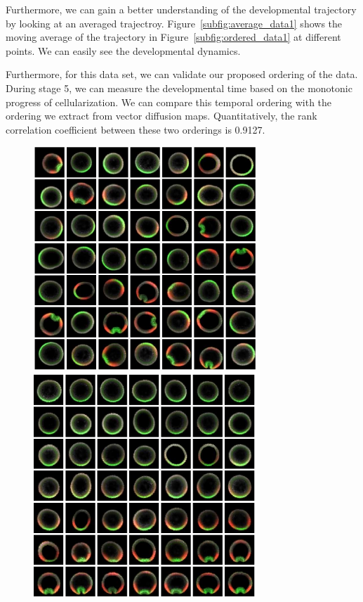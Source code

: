 \documentclass{pnastwo}
\begin{document}
\begin{article}
Furthermore, we can gain a better understanding of the developmental trajectory by looking at an averaged trajectroy.
%
Figure~\ref{subfig:average_data1} shows the moving average of the trajectory in Figure~\ref{subfig:ordered_data1} at different points. 
%
We can easily see the developmental dynamics.

Furthermore, for this data set, we can validate our proposed ordering of the data.
%
During stage 5, we can measure the developmental time based on the monotonic progress of cellularization.
%
We can compare this temporal ordering with the ordering we extract from vector diffusion maps. 
%
Quantitatively, the rank correlation coefficient between these two orderings is 0.9127.

\begin{figure}[t]
\includegraphics[width=8.4cm]{raw_data1}
\hfill
{}
\includegraphics[width=8.4cm]{VDM_data1_ordered}\\

\end{figure}
\end{article}
\end{document}
